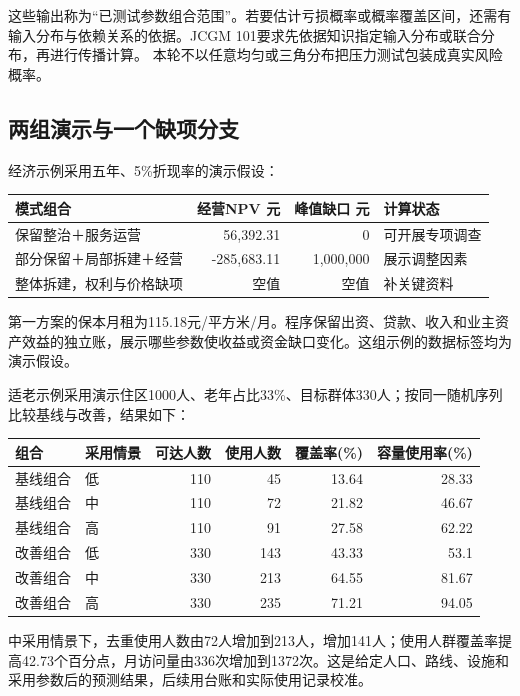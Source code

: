 这些输出称为“已测试参数组合范围”。若要估计亏损概率或概率覆盖区间，还需有输入分布与依赖关系的依据。JCGM 101要求先依据知识指定输入分布或联合分布，再进行传播计算。\cite{jcgm2008} 本轮不以任意均匀或三角分布把压力测试包装成真实风险概率。

\subsection{两组演示与一个缺项分支}

经济示例采用五年、5\%折现率的演示假设：
\begin{center}\small
\begin{tabular}{lrrl}\toprule
\textbf{模式组合} & \textbf{经营NPV 元} & \textbf{峰值缺口 元} & \textbf{计算状态}\\\midrule
保留整治＋服务运营 & 56,392.31 & 0 & 可开展专项调查\\
部分保留＋局部拆建＋经营 & -285,683.11 & 1,000,000 & 展示调整因素\\
整体拆建，权利与价格缺项 & 空值 & 空值 & 补关键资料\\\bottomrule
\end{tabular}\end{center}

第一方案的保本月租为115.18元/平方米/月。程序保留出资、贷款、收入和业主资产效益的独立账，展示哪些参数使收益或资金缺口变化。这组示例的数据标签均为演示假设。

适老示例采用演示住区1000人、老年占比33\%、目标群体330人；按同一随机序列比较基线与改善，结果如下：
\begin{center}\small
\begin{tabular}{llrrrr}
\hline
组合 & 采用情景 & 可达人数 & 使用人数 & 覆盖率(\%) & 容量使用率(\%) \\
\hline
基线组合 & 低 & 110 & 45 & 13.64 & 28.33 \\
基线组合 & 中 & 110 & 72 & 21.82 & 46.67 \\
基线组合 & 高 & 110 & 91 & 27.58 & 62.22 \\
改善组合 & 低 & 330 & 143 & 43.33 & 53.1 \\
改善组合 & 中 & 330 & 213 & 64.55 & 81.67 \\
改善组合 & 高 & 330 & 235 & 71.21 & 94.05 \\
\hline
\end{tabular}
\end{center}

中采用情景下，去重使用人数由72人增加到213人，增加141人；使用人群覆盖率提高42.73个百分点，月访问量由336次增加到1372次。这是给定人口、路线、设施和采用参数后的预测结果，后续用台账和实际使用记录校准。

